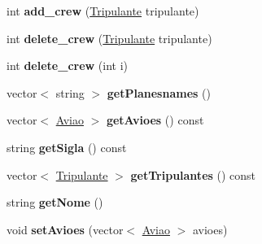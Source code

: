 \begin{DoxyCompactItemize}
\item 
\hypertarget{class_companhia__aerea_ac5e4c19ccc84b1b9a42262e3fbbedee9}{
int {\bfseries add\_\-crew} (\hyperlink{class_tripulante}{Tripulante} tripulante)}
\label{class_companhia__aerea_ac5e4c19ccc84b1b9a42262e3fbbedee9}

\item 
\hypertarget{class_companhia__aerea_a1c7a34b8106ebdb8a2e21baa5e37f07a}{
int {\bfseries delete\_\-crew} (\hyperlink{class_tripulante}{Tripulante} tripulante)}
\label{class_companhia__aerea_a1c7a34b8106ebdb8a2e21baa5e37f07a}

\item 
\hypertarget{class_companhia__aerea_a3df1dda263d17a1dc1a9483c6c000911}{
int {\bfseries delete\_\-crew} (int i)}
\label{class_companhia__aerea_a3df1dda263d17a1dc1a9483c6c000911}

\item 
\hypertarget{class_companhia__aerea_ab95a0859affcc3064dad567140cee468}{
vector$<$ string $>$ {\bfseries getPlanesnames} ()}
\label{class_companhia__aerea_ab95a0859affcc3064dad567140cee468}

\item 
\hypertarget{class_companhia__aerea_a155a7c2b9f758f1b4a472ebbe749bba5}{
vector$<$ \hyperlink{class_aviao}{Aviao} $>$ {\bfseries getAvioes} () const }
\label{class_companhia__aerea_a155a7c2b9f758f1b4a472ebbe749bba5}

\item 
\hypertarget{class_companhia__aerea_a741ebbdd890a23d59ec227a36290e9c6}{
string {\bfseries getSigla} () const }
\label{class_companhia__aerea_a741ebbdd890a23d59ec227a36290e9c6}

\item 
\hypertarget{class_companhia__aerea_a27666e3b87d328df49e697fc89111718}{
vector$<$ \hyperlink{class_tripulante}{Tripulante} $>$ {\bfseries getTripulantes} () const }
\label{class_companhia__aerea_a27666e3b87d328df49e697fc89111718}

\item 
\hypertarget{class_companhia__aerea_a3a5635fc2c05275488e21a01a65d6117}{
string {\bfseries getNome} ()}
\label{class_companhia__aerea_a3a5635fc2c05275488e21a01a65d6117}

\item 
\hypertarget{class_companhia__aerea_ac74245af225d79b25a90cff0f1a90b2a}{
void {\bfseries setAvioes} (vector$<$ \hyperlink{class_aviao}{Aviao} $>$ avioes)}
\label{class_companhia__aerea_ac74245af225d79b25a90cff0f1a90b2a}


\end{DoxyCompactItemize}
